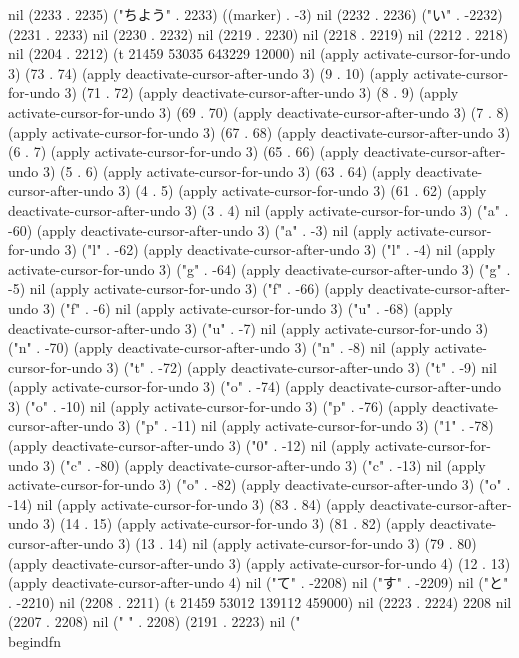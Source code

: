 nil (2233 . 2235) ("ちよう" . 2233) ((marker) . -3) nil (2232 . 2236) ("い" . -2232) (2231 . 2233) nil (2230 . 2232) nil (2219 . 2230) nil (2218 . 2219) nil (2212 . 2218) nil (2204 . 2212) (t 21459 53035 643229 12000) nil (apply activate-cursor-for-undo 3) (73 . 74) (apply deactivate-cursor-after-undo 3) (9 . 10) (apply activate-cursor-for-undo 3) (71 . 72) (apply deactivate-cursor-after-undo 3) (8 . 9) (apply activate-cursor-for-undo 3) (69 . 70) (apply deactivate-cursor-after-undo 3) (7 . 8) (apply activate-cursor-for-undo 3) (67 . 68) (apply deactivate-cursor-after-undo 3) (6 . 7) (apply activate-cursor-for-undo 3) (65 . 66) (apply deactivate-cursor-after-undo 3) (5 . 6) (apply activate-cursor-for-undo 3) (63 . 64) (apply deactivate-cursor-after-undo 3) (4 . 5) (apply activate-cursor-for-undo 3) (61 . 62) (apply deactivate-cursor-after-undo 3) (3 . 4) nil (apply activate-cursor-for-undo 3) ("a" . -60) (apply deactivate-cursor-after-undo 3) ("a" . -3) nil (apply activate-cursor-for-undo 3) ("l" . -62) (apply deactivate-cursor-after-undo 3) ("l" . -4) nil (apply activate-cursor-for-undo 3) ("g" . -64) (apply deactivate-cursor-after-undo 3) ("g" . -5) nil (apply activate-cursor-for-undo 3) ("f" . -66) (apply deactivate-cursor-after-undo 3) ("f" . -6) nil (apply activate-cursor-for-undo 3) ("u" . -68) (apply deactivate-cursor-after-undo 3) ("u" . -7) nil (apply activate-cursor-for-undo 3) ("n" . -70) (apply deactivate-cursor-after-undo 3) ("n" . -8) nil (apply activate-cursor-for-undo 3) ("t" . -72) (apply deactivate-cursor-after-undo 3) ("t" . -9) nil (apply activate-cursor-for-undo 3) ("o" . -74) (apply deactivate-cursor-after-undo 3) ("o" . -10) nil (apply activate-cursor-for-undo 3) ("p" . -76) (apply deactivate-cursor-after-undo 3) ("p" . -11) nil (apply activate-cursor-for-undo 3) ("1" . -78) (apply deactivate-cursor-after-undo 3) ("0" . -12) nil (apply activate-cursor-for-undo 3) ("c" . -80) (apply deactivate-cursor-after-undo 3) ("c" . -13) nil (apply activate-cursor-for-undo 3) ("o" . -82) (apply deactivate-cursor-after-undo 3) ("o" . -14) nil (apply activate-cursor-for-undo 3) (83 . 84) (apply deactivate-cursor-after-undo 3) (14 . 15) (apply activate-cursor-for-undo 3) (81 . 82) (apply deactivate-cursor-after-undo 3) (13 . 14) nil (apply activate-cursor-for-undo 3) (79 . 80) (apply deactivate-cursor-after-undo 3) (apply activate-cursor-for-undo 4) (12 . 13) (apply deactivate-cursor-after-undo 4) nil ("て" . -2208) nil ("す" . -2209) nil ("と" . -2210) nil (2208 . 2211) (t 21459 53012 139112 459000) nil (2223 . 2224) 2208 nil (2207 . 2208) nil (" " . 2208) (2191 . 2223) nil ("\\begin{dfn}
 
